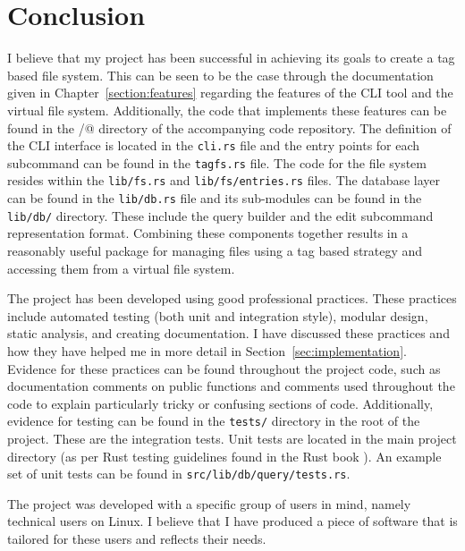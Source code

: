 \chapter{Conclusion}
\vspace{1cm}


I believe that my project has been successful in achieving its goals to create
a tag based file system. This can be seen to be the case through the
documentation given in Chapter~\ref{section:features} regarding the features of
the CLI tool and the virtual file system. Additionally, the code that
implements these features can be found in the \verb@src/@ directory of the
accompanying code repository. The definition of the CLI interface is located in
the \texttt{cli.rs} file and the entry points for each subcommand can be found
in the \texttt{tagfs.rs} file. The code for the file system resides within the
\texttt{lib/fs.rs} and \texttt{lib/fs/entries.rs} files. The database layer can
be found in the \texttt{lib/db.rs} file and its sub-modules can be found in the
\texttt{lib/db/} directory. These include the query builder and the edit
subcommand representation format. Combining these components together results
in a reasonably useful package for managing files using a tag based strategy
and accessing them from a virtual file system.

The project has been developed using good professional practices. These
practices include automated testing (both unit and integration style), modular
design, static analysis, and creating documentation. I have discussed these
practices and how they have helped me in more detail in
Section~\ref{sec:implementation}. Evidence for these practices can be found
throughout the project code, such as documentation comments on public functions
and comments used throughout the code to explain particularly tricky or
confusing sections of code. Additionally, evidence for testing can be found in
the \texttt{tests/} directory in the root of the project. These are the
integration tests. Unit tests are located in the main project directory (as per
Rust testing guidelines found in the Rust book \cite{rust-testing}). An example
set of unit tests can be found in \texttt{src/lib/db/query/tests.rs}.

The project was developed with a specific group of users in mind, namely
technical users on Linux. I believe that I have produced a piece of software
that is tailored for these users and reflects their needs.
